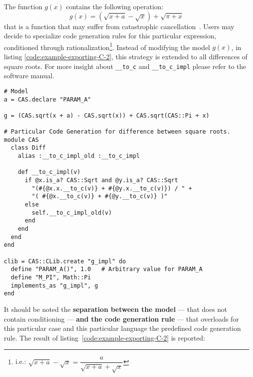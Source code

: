 The function $g(x)$ contains the following operation:
\begin{equation}
g(x) = (\sqrt{x + a} - \sqrt{x}) + \sqrt{\pi + x}
\end{equation}
that is a function that may suffer from catastrophic cancellation~\cite{higham2002accuracy}. Users may decide to specialize code generation rules for this particular expression, conditioned through rationalization\footnote{i.e.: $\sqrt{x + a} - \sqrt{x} = \dfrac{a}{\sqrt{x + a} + \sqrt{x}}$}. Instead of modifying the model $g(x)$, in listing \ref{code:example-exporting-C-2}, this strategy is extended to all differences of square roots. For more insight about \texttt{\_\_to\_c} and \texttt{\_\_to\_c\_impl} please refer to the software manual.

\noindent%
\begin{lstlisting}[caption={Conditioning in exporting function},label={code:example-exporting-C-2}]
# Model
a = CAS.declare "PARAM_A"

g = (CAS.sqrt(x + a) - CAS.sqrt(x)) + CAS.sqrt(CAS::Pi + x)

# Particular Code Generation for difference between square roots.
module CAS
  class Diff
    alias :__to_c_impl_old :__to_c_impl

    def __to_c_impl(v)
      if @x.is_a? CAS::Sqrt and @y.is_a? CAS::Sqrt
        "(#{@x.x.__to_c(v)} + #{@y.x.__to_c(v)}) / " +
        "( #{@x.__to_c(v)} + #{@y.__to_c(v)} )"
      else
        self.__to_c_impl_old(v)
      end
    end
  end
end

clib = CAS::CLib.create "g_impl" do
  define "PARAM_A()", 1.0   # Arbitrary value for PARAM_A
  define "M_PI", Math::Pi
  implements_as "g_impl", g
end
\end{lstlisting}
It should be noted the \textbf{separation between the model} --- that does not contain conditioning --- \textbf{and the code generation rule} --- that overloads for this particular case and this particular language the predefined code generation rule. The result of listing~\ref{code:example-exporting-C-2} is reported:

\noindent%
  \begin{minipage}{.5\textwidth}
    
  \end{minipage}\hfill
  \begin{minipage}{.5\textwidth}
    
  \end{minipage}

